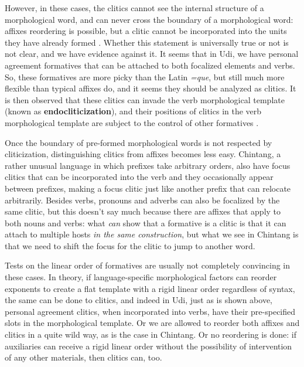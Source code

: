 \documentclass[a4paper, oneside, scheme=plain, 12pt]{article}
\newcommand*{\concept}[1]{\textbf{#1}}
\newcommand{\form}[1]{\emph{#1}}
\begin{document}
However, in these cases, the clitics cannot see the internal structure of a morphological word,
and can never cross the boundary of a morphological word:
affixes reordering is possible, but a clitic cannot be incorporated into the units they have already formed
\citep{embick2007linearization}.
Whether this statement is universally true or not is not clear,
and we have evidence against it.
It seems that in Udi, we have personal agreement formatives
that can be attached to both focalized elements and verbs.
So, these formatives are more picky than the Latin \form{=que}, but still much more flexible than typical affixes do,
and it seems they should be analyzed as clitics.
It is then observed that these clitics can invade the verb morphological template
(known as \concept{endocliticization}),
and their positions of clitics in the verb morphological template 
are subject to the control of other formatives \citep{harris2000word}.

Once the boundary of pre-formed morphological words is not respected by cliticization,
distinguishing clitics from affixes becomes less easy.
Chintang, a rather unusual language in which prefixes take arbitrary orders,
also have focus clitics that can be incorporated into the verb and
they occasionally appear between prefixes,
making a focus clitic just like another prefix that can relocate arbitrarily.
Besides verbs, pronouns and adverbs can also be focalized by the same clitic,
but this doesn't say much because there are affixes that apply to both nouns and verbs:
what \emph{can} show that a formative is a clitic is that
it can attach to multiple hosts \emph{in the same construction},
but what we see in Chintang is that we need to shift the focus 
for the clitic to jump to another word.

Tests on the linear order of formatives are usually not completely convincing in these cases.
In theory, if language-specific morphological factors can reorder exponents
to create a flat template with a rigid linear order regardless of syntax,
the same can be done to clitics,
and indeed in Udi, just as is shown above, personal agreement clitics,
when incorporated into verbs, have their pre-specified slots in the morphological template. 
Or we are allowed to reorder both affixes and clitics in a quite wild way,
as is the case in Chintang.
Or no reordering is done: if auxiliaries can receive a rigid linear order without the possibility of intervention of any other materials, then clitics can, too. 
\end{document}
